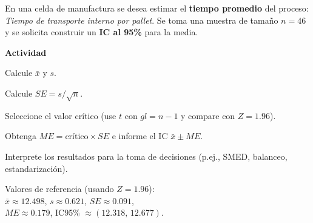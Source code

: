 \begin{ejercicio}[Tiempo de transporte interno por pallet (n=46)]
En una celda de manufactura se desea estimar el \textbf{tiempo promedio} del proceso: \emph{Tiempo de transporte interno por pallet}.
Se toma una muestra de tamaño $n=46$ y se solicita construir un \textbf{IC al 95\%} para la media.


\textbf{Actividad}
\begin{pasos}
  \item Calcule $\bar{x}$ y $s$.
  \item Calcule $SE = s/\sqrt{n}$.
  \item Seleccione el valor crítico (use $t$ con $gl=n-1$ y compare con $Z=1.96$).
  \item Obtenga $ME=\text{crítico}\times SE$ e informe el IC $\bar{x}\pm ME$.
  \item Interprete los resultados para la toma de decisiones (p.ej., SMED, balanceo, estandarización).
\end{pasos}

\begin{clave}
\noindent Valores de referencia (usando $Z=1.96$):\\
$\bar{x} \approx 12.498$, \quad $s \approx 0.621$, \quad $SE \approx 0.091$,\\
$ME \approx 0.179$, \quad IC95\% $\approx (12.318,\, 12.677)$.
\end{clave}
\end{ejercicio}


